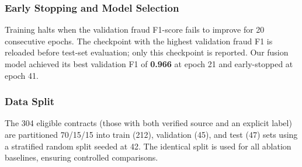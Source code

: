 \subsubsection{Early Stopping and Model Selection}
Training halts when the validation fraud F1-score fails to improve for
20 consecutive epochs.  The checkpoint with the highest validation fraud
F1 is reloaded before test-set evaluation; only this checkpoint is
reported.  Our fusion model achieved its best validation F1 of
\textbf{0.966} at epoch 21 and early-stopped at epoch 41.

\subsubsection{Data Split}
The 304 eligible contracts (those with both verified source and an
explicit label) are partitioned 70/15/15 into train (212), validation
(45), and test (47) sets using a stratified random split seeded at 42.
The identical split is used for all ablation baselines, ensuring
controlled comparisons.
